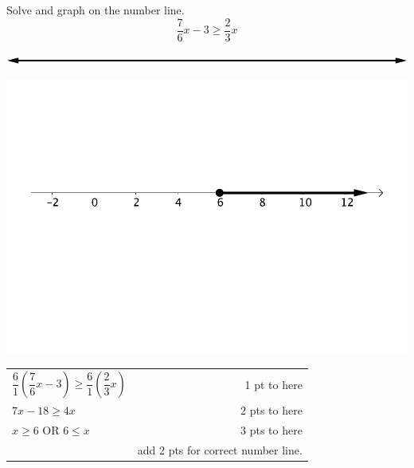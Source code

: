 {
	Solve and graph on the number line. $$\frac{7}{6}x-3 \geq \frac{2}{3}x$$\begin{onlyproblem}\begin{center}\includegraphics{numberLineNoNumbersNoTicks}\end{center}\end{onlyproblem} \begin{onlysolution}\begin{center}\includegraphics{fig095-07-5-b-answer}\end{center}\end{onlysolution}
}
{
	\begin{tabular}{l r}
	$\dfrac{6}{1}\left(\dfrac{7}{6}x-3\right) \geq \dfrac{6}{1}\left(\dfrac{2}{3}x\right)$ & 1 pt to here \\
	$7x-18\geq 4x$ & 2 pts to here \\
	$x\geq 6$ OR $6\leq x$ & 3 pts to here \\
	 & add 2 pts for correct number line.
	\end{tabular}
}

